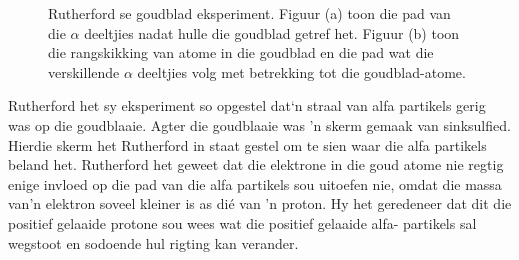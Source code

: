 \begin{figure}[H] %
 \begin{center}
\caption{Rutherford se goudblad eksperiment. Figuur (a) toon die pad van die $\alpha$ deeltjies nadat hulle die goudblad getref het. Figuur (b) toon die rangskikking van atome in die goudblad en die pad wat die verskillende $\alpha$ deeltjies volg met betrekking tot die goudblad-atome.}
\label{fig:atom:goldfoil}
\end{center}
\end{figure}       
\label{m38756*id254715}
Rutherford het sy eksperiment so opgestel dat‘n straal van alfa partikels gerig was op die goudblaaie. Agter die goudblaaie was 'n skerm gemaak van sinksulfied. Hierdie skerm het Rutherford in staat gestel om te sien waar die alfa partikels beland het. Rutherford het geweet dat die elektrone in die goud atome nie regtig enige invloed op die pad van die alfa partikels sou uitoefen nie, omdat die massa van'n elektron soveel kleiner is as dié van 'n proton. Hy het geredeneer dat dit die positief gelaaide protone sou wees wat die positief gelaaide alfa- partikels sal wegstoot en sodoende hul rigting kan verander.\par 
